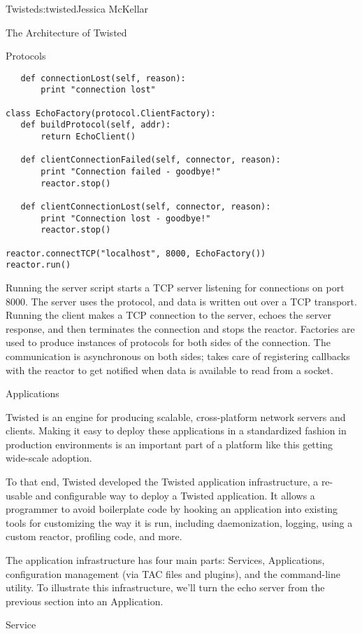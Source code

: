\begin{aosachapter}{Twisted}{s:twisted}{Jessica McKellar}
\begin{aosasect1}{The Architecture of Twisted}
\begin{aosasect2}{Protocols}
\begin{verbatim}
   def connectionLost(self, reason):
       print "connection lost"

class EchoFactory(protocol.ClientFactory):
   def buildProtocol(self, addr):
       return EchoClient()

   def clientConnectionFailed(self, connector, reason):
       print "Connection failed - goodbye!"
       reactor.stop()

   def clientConnectionLost(self, connector, reason):
       print "Connection lost - goodbye!"
       reactor.stop()

reactor.connectTCP("localhost", 8000, EchoFactory())
reactor.run()
\end{verbatim}

Running the server script starts a TCP server listening for connections on
port 8000. The server uses the  protocol, and data is written
out over a TCP transport. Running the client makes a TCP connection to the
server, echoes the server response, and then terminates the connection and stops
the reactor. Factories are used to produce instances of protocols for both sides
of the connection. The communication is asynchronous on both sides;
 takes care of registering callbacks with the reactor to
get notified when data is available to read from a socket.

\end{aosasect2}

\begin{aosasect2}{Applications}

Twisted is an engine for producing scalable, cross-platform network servers
and clients. Making it easy to deploy these applications in a standardized
fashion in production environments is an important part of a platform like this
getting wide-scale adoption.

To that end, Twisted developed the Twisted application infrastructure, a
re-usable and configurable way to deploy a Twisted application. It allows a
programmer to avoid boilerplate code by hooking an application into existing
tools for customizing the way it is run, including daemonization, logging, using
a custom reactor, profiling code, and more.

The application infrastructure has four main parts: Services, Applications,
configuration management (via TAC files and plugins), and the 
command-line utility. To illustrate this infrastructure, we'll turn the echo
server from the previous section into an Application.

\begin{aosasect3}{Service}


\end{aosasect3}
\end{aosasect2}
\end{aosasect1}
\end{aosachapter}
